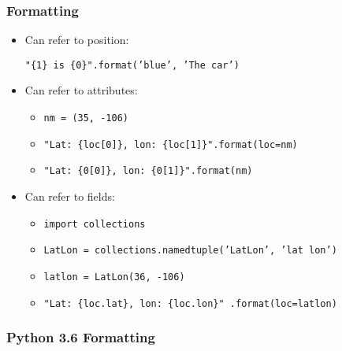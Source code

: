 \documentclass{beamer}
\begin{document}
%
%
\begin{frame}
  \frametitle{Formatting}
  \begin{itemize}
    \item Can refer to position:
    \begin{itemize}
      \texttt{"\{1\} is \{0\}".format('blue', 'The car')}
    \end{itemize}
    \item Can refer to attributes: 
    \begin{itemize}
      \item \texttt{nm = (35, -106)}
      \item \texttt{"Lat: \{loc[0]\}, lon: \{loc[1]\}".format(loc=nm)}
      \item \texttt{"Lat: \{0[0]\}, lon: \{0[1]\}".format(nm)}
    \end{itemize}
    \item Can refer to fields:
    \begin{itemize}
      \item \texttt{import collections}
      \item \texttt{LatLon = collections.namedtuple('LatLon', 'lat lon')}
      \item \texttt{latlon = LatLon(36, -106)}
      \item \texttt{"Lat: \{loc.lat\}, lon: \{loc.lon\}" .format(loc=latlon)}
    \end{itemize}
  \end{itemize}
\end{frame}

%
%
\begin{frame}
 \frametitle{Python 3.6 Formatting}
\end{frame}
\end{document}
